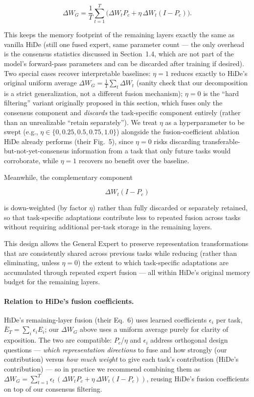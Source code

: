\documentclass[a4paper]{article}
\begin{document}
\begin{equation}
\boxed{
\Delta W_G
=
\frac1T
\sum_{t=1}^{T}
\Big(
\Delta W_tP_c
+
\eta\,\Delta W_t(I-P_c)
\Big).
}
\end{equation}

This keeps the memory footprint of the remaining layers exactly the same as vanilla HiDe (still one fused expert, same parameter count — the only overhead is the consensus statistics discussed in Section~1.4, which are not part of the model's forward-pass parameters and can be discarded after training if desired). Two special cases recover interpretable baselines: $\eta{=}1$ reduces exactly to HiDe's original uniform average $\Delta W_G=\frac1T\sum_t\Delta W_t$ (sanity check that our decomposition is a strict generalization, not a different fusion mechanism); $\eta{=}0$ is the ``hard filtering'' variant originally proposed in this section, which fuses only the consensus component and \emph{discards} the task-specific component entirely (rather than an unrealizable ``retain separately''). We treat $\eta$ as a hyperparameter to be swept (e.g., $\eta\in\{0,0.25,0.5,0.75,1.0\}$) alongside the fusion-coefficient ablation HiDe already performs (their Fig.~5), since $\eta{=}0$ risks discarding transferable-but-not-yet-consensus information from a task that only future tasks would corroborate, while $\eta{=}1$ recovers no benefit over the baseline.

Meanwhile, the complementary component

\begin{equation}
\Delta W_t(I-P_c)
\end{equation}

is down-weighted (by factor $\eta$) rather than fully discarded or separately retained, so that task-specific adaptations contribute less to repeated fusion across tasks without requiring additional per-task storage in the remaining layers.

This design allows the General Expert to preserve representation transformations that are consistently shared across previous tasks while reducing (rather than eliminating, unless $\eta{=}0$) the extent to which task-specific adaptations are accumulated through repeated expert fusion — all within HiDe's original memory budget for the remaining layers.

\paragraph{Relation to HiDe's fusion coefficients.} HiDe's remaining-layer fusion (their Eq.~6) uses learned coefficients $\epsilon_i$ per task, $\bar E_T = \sum_i \epsilon_i E_i$; our $\Delta W_G$ above uses a uniform average purely for clarity of exposition. The two are compatible: $P_c$/$\eta$ and $\epsilon_i$ address orthogonal design questions — \emph{which representation directions} to fuse and how strongly (our contribution) versus \emph{how much weight} to give each task's contribution (HiDe's contribution) — so in practice we recommend combining them as $\Delta W_G = \sum_{t=1}^T \epsilon_t\, (\Delta W_t P_c + \eta\,\Delta W_t(I-P_c))$, reusing HiDe's fusion coefficients on top of our consensus filtering.
\end{document}

